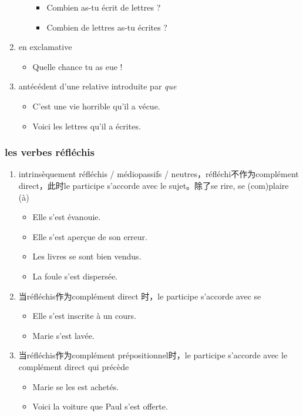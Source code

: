 \documentclass[UTF8]{report}
\begin{document}
\begin{enumerate}
\begin{enumerate}
\begin{itemize}
            \item Combien as-tu écrit de lettres ?
            \item Combien de lettres as-tu écrites ?
        \end{itemize}
    \end{enumerate}
    \item en exclamative
    \begin{itemize}
        \item Quelle chance tu as eue !
    \end{itemize}
    \item antécédent d’une relative introduite par \textit{que}
    \begin{itemize}
        \item C’est une vie horrible qu’il a vécue.
        \item Voici les lettres qu’il a écrites.
    \end{itemize}
\end{enumerate}




\subsubsection{les verbes réfléchis}
\begin{enumerate}
    \item intrinsèquement réfléchis / médiopassifs / neutres，réfléchi不作为complément direct，此时le participe s’accorde avec le sujet。除了se rire, se (com)plaire (à)
    \begin{itemize}
        \item Elle s’est évanouie.
        \item Elle s’est aperçue de son erreur.
        \item Les livres se sont bien vendus.
        \item La foule s’est dispersée.
    \end{itemize}
    \item 当réfléchis作为complément direct 时，le participe s’accorde avec se
    \begin{itemize}
        \item Elle s’est inscrite à un cours.
        \item Marie s’est lavée.
    \end{itemize}
    \item 当réfléchis作为complément prépositionnel时，le participe s’accorde avec le complément direct qui précède
    \begin{itemize}
        \item Marie se les est achetés.
        \item Voici la voiture que Paul s’est offerte.
    \end{itemize}
\end{enumerate}
\end{document}

